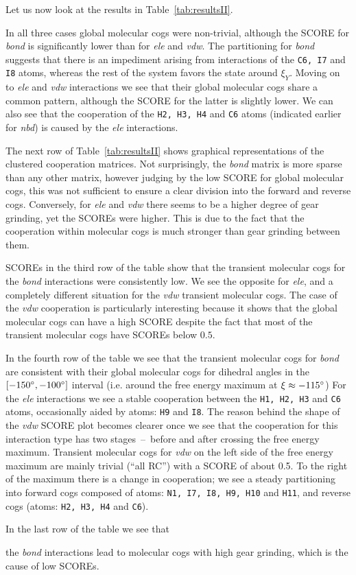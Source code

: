 Let us now look at the results in Table~\ref{tab:resultsII}.
{\color{black}In all three cases global molecular cogs were non-trivial, although the SCORE for \emph{bond} is significantly lower than for \emph{ele} and \emph{vdw}.
The partitioning for \emph{bond} suggests that there is an impediment arising from interactions of the \texttt{C6, I7} and \texttt{I8} atoms, whereas the rest of the system favors the state around $\xi_Y$.
Moving on to \emph{ele} and \emph{vdw} interactions we see that their global molecular cogs share a common pattern, although the SCORE for the latter is slightly lower.
We can also see that the cooperation of the \texttt{H2, H3, H4} and \texttt{C6} atoms (indicated earlier for \emph{nbd}) is caused by the \emph{ele} interactions.

The next row of Table~\ref{tab:resultsII} shows graphical representations of the clustered cooperation matrices.
Not surprisingly, the \emph{bond} matrix is more sparse than any other matrix, however judging by the low SCORE for global molecular cogs, this was not sufficient to ensure a clear division into the forward and reverse cogs.
Conversely, for \emph{ele} and \emph{vdw} there seems to be a higher degree of gear grinding, yet the SCOREs were higher.
This is due to the fact that the cooperation within molecular cogs is much stronger than gear grinding between them.

SCOREs in the third row of the table show that the transient molecular cogs for the \emph{bond} interactions were consistently low.
We see the opposite for \emph{ele}, and a completely different situation for the \emph{vdw} transient molecular cogs.
The case of the \emph{vdw} cooperation is particularly interesting because it shows that the global molecular cogs can have a high SCORE despite the fact that most of the transient molecular cogs have SCOREs below $0.5$.

In the fourth row of the table we see that the transient molecular cogs for \emph{bond} are consistent with their global molecular cogs for dihedral angles in the $[-150\degree,-100\degree]$ interval (i.e. around the free energy maximum at $\xi\approx-115\degree$)
For the \emph{ele} interactions we see a stable cooperation between the \texttt{H1, H2, H3} and \texttt{C6} atoms, occasionally aided by atoms: \texttt{H9} and \texttt{I8}.
The reason behind the shape of the \emph{vdw} SCORE plot becomes clearer once we see that the cooperation for this interaction type has two stages~--~before and after crossing the free energy maximum.
Transient molecular cogs for \emph{vdw} on the left side of the free energy maximum are mainly trivial (``all RC'') with a SCORE of about 0.5.
To the right of the maximum there is a change in cooperation; we see a steady partitioning into forward cogs composed of atoms: \texttt{N1, I7, I8, H9, H10} and \texttt{H11}, and reverse cogs (atoms: \texttt{H2, H3, H4} and \texttt{C6}).

In the last row of the table we see that} the \emph{bond} interactions lead to molecular cogs with high gear grinding, which is the cause of low SCOREs.
